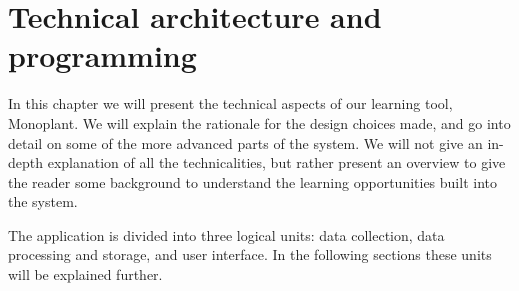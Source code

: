 \chapter{Technical architecture and programming}
In this chapter we will present the technical aspects of our learning tool, Monoplant. We will explain the rationale for the design choices made, and go into detail on some of the more advanced parts of the system. We will not give an in-depth explanation of all the technicalities, but rather present an overview to give the reader some background to understand the learning opportunities built into the system. 

The application is divided into three logical units: data collection, data processing and storage, and user interface. In the following sections these units will be explained further. 





